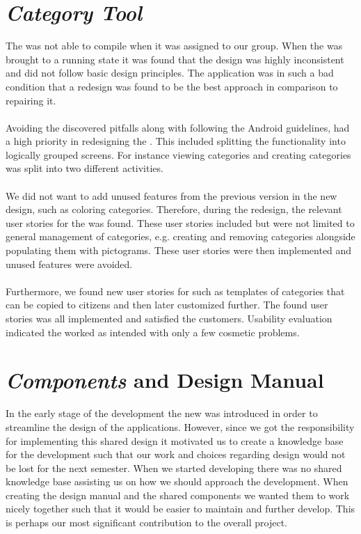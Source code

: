 \section*{\emph{Category Tool}}
The \ct was not able to compile when it was assigned to our group. When the \ct was brought to a running state it was found that the design was highly inconsistent and did not follow basic design principles. The application was in such a bad condition that a redesign was found to be the best approach in comparison to repairing it.
\\\\
Avoiding the discovered pitfalls along with following the Android guidelines, had a high priority in redesigning the \ct. This included splitting the functionality into logically grouped screens. For instance viewing categories and creating categories was split into two different activities.
\\\\
We did not want to add unused features from the previous version in the new design, such as coloring categories. Therefore, during the redesign, the relevant user stories for the \ct was found. These user stories included but were not limited to general management of categories, e.g. creating and removing categories alongside populating them with pictograms. These user stories were then implemented and unused features were avoided. 
\\\\
Furthermore, we found new user stories for \ct such as templates of categories that can be copied to citizens and then later customized further. The found user stories was all implemented and satisfied the customers. Usability evaluation indicated the \ct worked as intended with only a few cosmetic problems.

\section*{\giraf \emph{Components} and Design Manual}
In the early stage of the development the new \gc was introduced in order to streamline the design of the \giraf applications. However, since we got the responsibility for implementing this shared design it motivated us to create a knowledge base for the development such that our work and choices regarding design would not be lost for the next semester. When we started developing there was no shared knowledge base assisting us on how we should approach the development. When creating the design manual and the shared components we wanted them to work nicely together such that it would be easier to maintain and further develop. This is perhaps our most significant contribution to the overall project.